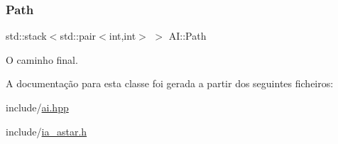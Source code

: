 \subsubsection{\texorpdfstring{Path}{Path}}
{\footnotesize\ttfamily std\+::stack$<$std\+::pair$<$int,int$>$ $>$ A\+I\+::\+Path\hspace{0.3cm}{\ttfamily [private]}}



O caminho final. 



A documentação para esta classe foi gerada a partir dos seguintes ficheiros\+:\begin{DoxyCompactItemize}
\item 
include/\hyperlink{ai_8hpp}{ai.\+hpp}\item 
include/\hyperlink{ia__astar_8h}{ia\+\_\+astar.\+h}\end{DoxyCompactItemize}
